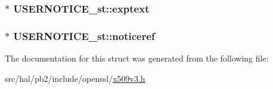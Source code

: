 \subsubsection[{\texorpdfstring{exptext}{exptext}}]{$\ast$ U\+S\+E\+R\+N\+O\+T\+I\+C\+E\+\_\+st\+::exptext}\hypertarget{struct_u_s_e_r_n_o_t_i_c_e__st_a7009a63ef5ede50320b870f832a50ecd}{}\label{struct_u_s_e_r_n_o_t_i_c_e__st_a7009a63ef5ede50320b870f832a50ecd}
\subsubsection[{\texorpdfstring{noticeref}{noticeref}}]{$\ast$ U\+S\+E\+R\+N\+O\+T\+I\+C\+E\+\_\+st\+::noticeref}\hypertarget{struct_u_s_e_r_n_o_t_i_c_e__st_a5d1c9ae026549fc43f6443d1df42b956}{}\label{struct_u_s_e_r_n_o_t_i_c_e__st_a5d1c9ae026549fc43f6443d1df42b956}


The documentation for this struct was generated from the following file\+:\begin{DoxyCompactItemize}
\item 
src/hal/pb2/include/openssl/\hyperlink{x509v3_8h}{x509v3.\+h}\end{DoxyCompactItemize}
